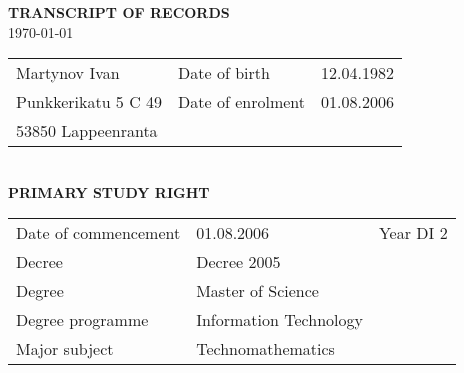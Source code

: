 \documentclass{article}
\begin{document}
\begin{center}
    \large{\textbf{TRANSCRIPT OF RECORDS}}\\
    \today
\end{center}

\begin{tabular}{p{5cm} p{3cm} r}
    Martynov Ivan & Date of birth & 12.04.1982\\
    Punkkerikatu 5 C 49 & Date of enrolment & 01.08.2006\\
    53850 Lappeenranta&&
\end{tabular}\\

{\textbf{PRIMARY STUDY RIGHT}}

\begin{tabular}{l l l}
    Date of commencement & 01.08.2006 & Year  DI 2\\
    Decree & Decree 2005\\
    Degree & Master of Science\\
    Degree programme & Information Technology\\
    Major subject & Technomathematics
\end{tabular}\bigskip
\end{document}
